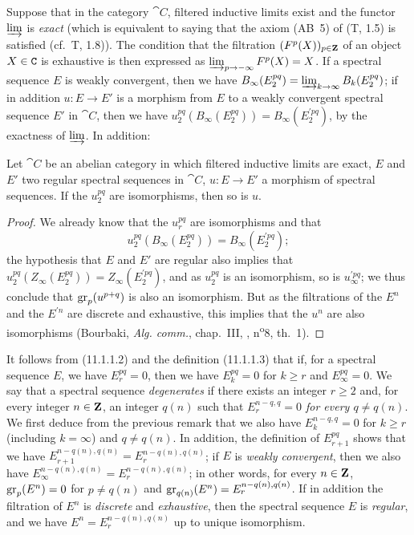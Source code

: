 \begin{env}[11.1.4]
\label{0.11.1.4}
Suppose that in the category $\cat{C}$, filtered inductive limits exist and the functor $\varinjlim$ is \emph{exact} (which is equivalent to saying that the axiom (AB~5) of (T, 1.5) is satisfied (cf.~T, 1.8)).
The condition that the filtration $(F^p(X))_{p\in\mathbf{Z}}$ of an object $X\in\mathtt{C}$ is exhaustive is then expressed as $\varinjlim_{p\to-\infty}F^p(X)=X$.
If a spectral sequence $E$ is weakly convergent, then we have $B_\infty(E_2^{pq})=\varinjlim_{k\to\infty}B_k(E_2^{pq})$; if in addition $u:E\to E'$ is a morphism from $E$ to a weakly convergent spectral sequence $E'$ in $\cat{C}$, then we have $u_2^{pq}(B_\infty(E_2^{pq}))=B_\infty(E_2^{\prime pq})$, by the exactness of $\varinjlim$.
In addition:
\end{env}

\begin{proposition}[11.1.5]
\label{0.11.1.5}
Let $\cat{C}$ be an abelian category in which filtered inductive limits are exact, $E$ and $E'$ two regular spectral sequences in $\cat{C}$, $u:E\to E'$ a morphism of spectral sequences.
If the $u_2^{pq}$ are isomorphisms, then so is $u$.
\end{proposition}

\begin{proof}
We already know  that the $u_r^{pq}$ are isomorphisms and that
\[
  u_2^{pq}(B_\infty(E_2^{pq}))=B_\infty(E_2^{\prime pq});
\]
the hypothesis that $E$ and $E'$ are regular also implies that $u_2^{pq}(Z_\infty(E_2^{pq}))=Z_\infty(E_2^{\prime pq})$, and as $u_2^{pq}$ is an isomorphism, so is $u_\infty^{\prime pq}$; we thus conclude that $\operatorname{gr}_p(u^{p+q})$ is also an isomorphism.
But as the filtrations of the $E^n$ and the $E^{\prime n}$ are discrete and exhaustive, this implies that the $u^n$ are also isomorphisms (Bourbaki, \emph{Alg. comm.}, chap.~III, , n\textsuperscript{o}8, th.~1).
\end{proof}

\begin{env}[11.1.6]
\label{0.11.1.6}
It follows from (11.1.1.2) and the definition (11.1.1.3) that if, for a spectral sequence $E$, we have $E_r^{pq}=0$, then we have $E_k^{pq}=0$ for $k\geq r$ and $E_\infty^{pq}=0$.
We say that a spectral sequence \emph{degenerates} if there exists an integer $r\geq 2$ and, for every integer $n\in\mathbf{Z}$, an integer $q(n)$ such that \emph{$E_r^{n-q,q}=0$ for every $q\neq q(n)$}.
We first deduce from the previous remark that we also have $E_k^{n-q,q}=0$ for $k\geq r$ (including $k=\infty$) and $q\neq q(n)$.
In addition, the definition of $E_{r+1}^{pq}$ shows that we have $E_{r+1}^{n-q(n),q(n)}=E_r^{n-q(n),q(n)}$; if $E$ is \emph{weakly convergent}, then we also have $E_\infty^{n-q(n),q(n)}=E_r^{n-q(n),q(n)}$; in other words, for every $n\in\mathbf{Z}$, $\operatorname{gr}_p(E^n)=0$ for $p\neq q(n)$ and $\operatorname{gr}_{q(n)}(E^n)=E_r^{n-q(n),q(n)}$.
If in addition the filtration of $E^n$ is \emph{discrete} and \emph{exhaustive}, then the spectral sequence $E$ is \emph{regular}, and we have $E^n=E_r^{n-q(n),q(n)}$ up to unique isomorphism.
\end{env}

